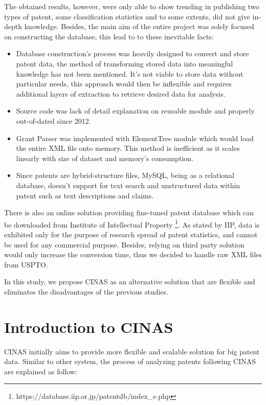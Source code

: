\documentclass{sig-alternate}
\begin{document}
{The obtained results, however, were only able to show trending in publishing two types of patent, some classification statistics and to some extents, did not give in-depth knowledge. Besides, the main aim of the entire project was solely focused on constructing the database, this lead to to these inevitable facts:

\begin{itemize}
\item Database construction's process was heavily designed to convert and store patent data, the method of transforming stored data into meaningful knowledge has not been mentioned. It's not viable to store data without particular needs, this approach would then be inflexible and requires additional layers of extraction to retrieve desired data for analysis.
\item Source code was lack of detail explanation on reusable module and properly out-of-dated since 2012.
\item Grant Parser was implemented with ElementTree module which would load the entire XML file onto memory. This method is inefficient as it scales linearly with size of dataset and memory's consumption.
\item Since patents are hybrid-structure files, MySQL, being as a relational database, doesn't support for text search and unstructured data within patent such as text descriptions and claims. 
\end{itemize}

There is also an online solution providing fine-tuned patent database which can be downloaded from Institute of Intellectual Property \footnote{https://database.iip.or.jp/patentdb/index\_e.php}. As stated by IIP, data is exhibited only for the purpose of research spread of patent statistics, and cannot be used for any commercial purpose. Besides, relying on third party solution would only increase the conversion time, thus we decided to handle raw XML files from USPTO.

In this study, we propose CINAS as an alternative solution that are flexible and eliminates the disadvantages of the previous studies.

\section{Introduction to CINAS}
CINAS initially aims to provide more flexible and scalable solution for big patent data. Similar to other system, the process of analyzing patents following CINAS are explained as follow:

}
\end{document}
